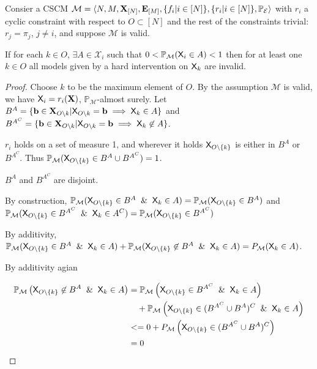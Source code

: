 \begin{theorem}\label{th:recursive_no_interventions}
Consier a CSCM $\mathcal{M}=\langle N,M,\mathbf{X}_{[N]},\mathbf{E}_{[M]},\{f_i|i\in[N]\},\{r_i|i\in [N]\},\mathbb{P}_{\mathcal{E}}\rangle$ with $r_i$ a cyclic constraint with respect to $O\subset[N]$ and the rest of the constraints trivial: $r_j = \pi_j$, $j\neq i$, and suppose $\mathcal{M}$ is valid.

If for each $k\in O$, $\exists A\in \mathcal{X}_i$ such that $0<\mathbb{P}_{\mathcal{M}}(\mathsf{X}_i\in A)<1$ then for at least one $k\in O$ all models given by a hard intervention on $\mathsf{X}_k$ are invalid.
\end{theorem}

\begin{proof}
Choose $k$ to be the maximum element of $O$. By the assumption $\mathcal{M}$ is valid, we have $\mathsf{X}_i=r_i(\mathbf{X})$, $\mathbb{P}_{\mathcal{M}}$-almost surely. Let $B^A=\{\mathbf{b}\in \mathbf{X}_{O\setminus k}|\mathsf{X}_{O\setminus k}=\mathbf{b}\implies \mathsf{X}_k \in A\}$ and $B^{A^C}=\{\mathbf{b}\in \mathbf{X}_{O\setminus k}|\mathsf{X}_{O\setminus k}=\mathbf{b}\implies \mathsf{X}_k \not\in A\}$. 

$r_i$ holds on a set of measure 1, and wherever it holds $\mathsf{X}_{O\setminus\{k\}}$ is either in $B^A$ or $B^{A^C}$. Thus $\mathbb{P}_{\mathcal{M}}(\mathsf{X}_{O\setminus\{k\}}\in B^A\cup B^{A^C})=1$. 

$B^A$ and $B^{A^C}$ are disjoint.

By construction, $\mathbb{P}_{\mathcal{M}}(\RV{X}_{O\setminus\{k\}}\in B^A \And \RV{X}_k\in A) = \mathbb{P}_{\mathcal{M}}(\RV{X}_{O\setminus\{k\}}\in B^A)$ and $\mathbb{P}_{\mathcal{M}}(\RV{X}_{O\setminus\{k\}}\in B^{A^C} \And \RV{X}_k\in A^C) = \mathbb{P}_{\mathcal{M}}(\RV{X}_{O\setminus\{k\}}\in B^{A^C})$

By additivity, $\mathbb{P}_{\mathcal{M}}(\RV{X}_{O\setminus\{k\}}\in B^A \And \RV{X}_k\in A) + \mathbb{P}_{\mathcal{M}} (\RV{X}_{O\setminus\{k\}}\not\in B^A \And \RV{X}_k\in A)=P_{\mathcal{M}} (\RV{X}_k\in A)$. 

By additivity agian

\begin{align}
    \mathbb{P}_{\mathcal{M}} \left(\RV{X}_{O\setminus\{k\}}\not\in B^A \And \RV{X}_k\in A\right) &=\mathbb{P}_{\mathcal{M}} \left(\RV{X}_{O\setminus\{k\}}\in B^{A^C} \And \RV{X}_k\in A\right) \\
    &\quad+  \mathbb{P}_{\mathcal{M}} \left(\RV{X}_{O\setminus\{k\}}\in (B^{A^C}\cup B^A)^C \And \RV{X}_k\in A\right)\\
    &<= 0 + P_{\mathcal{M}} \left(\RV{X}_{O\setminus\{k\}}\in (B^{A^C}\cup B^A)^C\right)\\
    &= 0
\end{align}


\end{proof}
